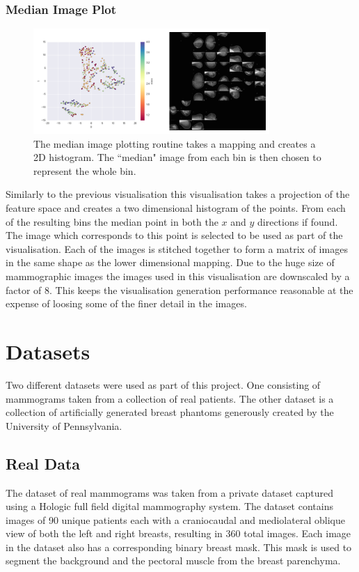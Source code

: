 \subsubsection{Median Image Plot}

\begin{figure}[H]
	\label{fig:median-image}
	\centering
	\includegraphics[width=0.8\textwidth]{Images/median-image.png}	
	\caption{The median image plotting routine takes a mapping and creates a 2D histogram. The ``median" image from each bin is then chosen to represent the whole bin.}
\end{figure}

Similarly to the previous visualisation this visualisation takes a projection of the feature space and creates a two dimensional histogram of the points. From each of the resulting bins the median point in both the $x$ and $y$ directions if found. The image which corresponds to this point is selected to be used as part of the visualisation. Each of the images is stitched together to form a matrix of images in the same shape as the lower dimensional mapping. Due to the huge size of mammographic images the images used in this visualisation are downscaled by a factor of 8. This keeps the visualisation generation performance reasonable at the expense of loosing some of the finer detail in the images.

\section{Datasets}
\label{sec:datasets}
Two different datasets were used as part of this project. One consisting of mammograms taken from a collection of real patients. The other dataset is a collection of artificially generated breast phantoms generously created by the University of Pennsylvania. 

\subsection{Real Data}
The dataset of real mammograms was taken from a private dataset captured using a Hologic full field digital mammography system. The dataset contains images of 90 unique patients each with a craniocaudal and mediolateral oblique view of both the left and right breasts, resulting in 360 total images. Each image in the dataset also has a corresponding binary breast mask. This mask is used to segment the  background and the pectoral muscle from the breast parenchyma.

